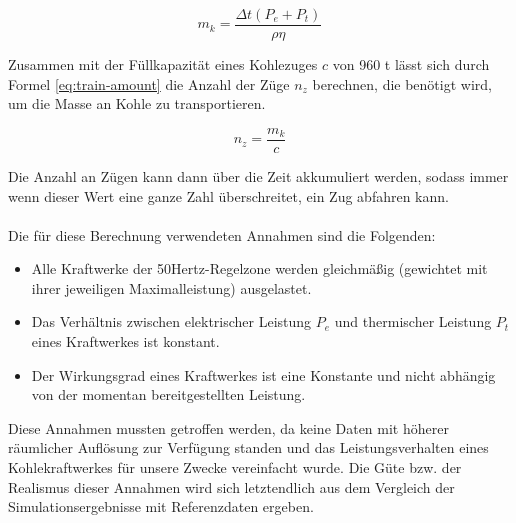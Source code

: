 \begin{equation}
    m_k=\frac{\Delta t(P_e+P_t)}{\rho\eta}\label{eq:coal-mass}
\end{equation}

Zusammen mit der Füllkapazität eines Kohlezuges $c$ von 960 t lässt sich durch Formel \ref{eq:train-amount} die Anzahl der Züge $n_z$ berechnen, die benötigt wird, um die Masse an Kohle zu transportieren.

\begin{equation}
    n_z=\frac{m_k}{c}\label{eq:train-amount}
\end{equation}

Die Anzahl an Zügen kann dann über die Zeit akkumuliert werden, sodass immer wenn dieser Wert eine ganze Zahl überschreitet, ein Zug abfahren kann.\\
\\
Die für diese Berechnung verwendeten Annahmen sind die Folgenden:
\begin{itemize}
    \item Alle Kraftwerke der 50Hertz-Regelzone werden gleichmäßig (gewichtet mit ihrer jeweiligen Maximalleistung) ausgelastet.
    \item Das Verhältnis zwischen elektrischer Leistung $P_e$ und thermischer Leistung $P_t$ eines Kraftwerkes ist konstant.
    \item Der Wirkungsgrad eines Kraftwerkes ist eine Konstante und nicht abhängig von der momentan bereitgestellten Leistung.
\end{itemize}
Diese Annahmen mussten getroffen werden, da keine Daten mit höherer räumlicher Auflösung zur Verfügung standen und das Leistungsverhalten eines Kohlekraftwerkes für unsere Zwecke vereinfacht wurde. Die Güte bzw. der Realismus dieser Annahmen wird sich letztendlich aus dem Vergleich der Simulationsergebnisse mit Referenzdaten ergeben.
